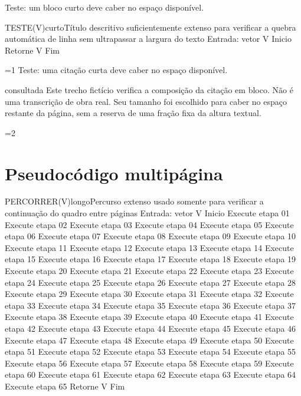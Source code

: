 \documentclass[perfil=artigo]{undftex}
\begin{document}
\textual\singlespacing
\noindent Teste: um bloco curto deve caber no espaço disponível.
\vspace*{.58\textheight}
\begin{undfpseudocodigo}{TESTE(V)}{curto}{Título descritivo suficientemente extenso para verificar a quebra automática de linha sem ultrapassar a largura do texto}
Entrada: vetor V
Inicio
  Retorne V
Fim
\end{undfpseudocodigo}
\ifnum\value{page}=1\else{}\fi
\clearpage
\noindent Teste: uma citação curta deve caber no espaço disponível.
\vspace*{.69\textheight}
\begin{citacaolonga}[9]{consultada}
Este trecho fictício verifica a composição da citação em bloco. Não é uma
transcrição de obra real. Seu tamanho foi escolhido para caber no espaço
restante da página, sem a reserva de uma fração fixa da altura textual.
\end{citacaolonga}
\ifnum\value{page}=2\else{}\fi
\clearpage
\section{Pseudocódigo multipágina}
\label{obj:pseudocodigo-inicio}
\begin{undfpseudocodigolongo}{PERCORRER(V)}{longo}{Percurso extenso usado somente para verificar a continuação do quadro entre páginas}
Entrada: vetor V
Inicio
  Execute etapa 01
  Execute etapa 02
  Execute etapa 03
  Execute etapa 04
  Execute etapa 05
  Execute etapa 06
  Execute etapa 07
  Execute etapa 08
  Execute etapa 09
  Execute etapa 10
  Execute etapa 11
  Execute etapa 12
  Execute etapa 13
  Execute etapa 14
  Execute etapa 15
  Execute etapa 16
  Execute etapa 17
  Execute etapa 18
  Execute etapa 19
  Execute etapa 20
  Execute etapa 21
  Execute etapa 22
  Execute etapa 23
  Execute etapa 24
  Execute etapa 25
  Execute etapa 26
  Execute etapa 27
  Execute etapa 28
  Execute etapa 29
  Execute etapa 30
  Execute etapa 31
  Execute etapa 32
  Execute etapa 33
  Execute etapa 34
  Execute etapa 35
  Execute etapa 36
  Execute etapa 37
  Execute etapa 38
  Execute etapa 39
  Execute etapa 40
  Execute etapa 41
  Execute etapa 42
  Execute etapa 43
  Execute etapa 44
  Execute etapa 45
  Execute etapa 46
  Execute etapa 47
  Execute etapa 48
  Execute etapa 49
  Execute etapa 50
  Execute etapa 51
  Execute etapa 52
  Execute etapa 53
  Execute etapa 54
  Execute etapa 55
  Execute etapa 56
  Execute etapa 57
  Execute etapa 58
  Execute etapa 59
  Execute etapa 60
  Execute etapa 61
  Execute etapa 62
  Execute etapa 63
  Execute etapa 64
  Execute etapa 65
  Retorne V
Fim
\end{undfpseudocodigolongo}
\label{obj:pseudocodigo-fim}
\clearpage
\end{document}
